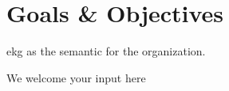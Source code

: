 \section{Goals \& Objectives}\label{sec:ekgmm-b-1-1} %

\gls{ekg} as the semantic  for the organization.

We welcome your input here
